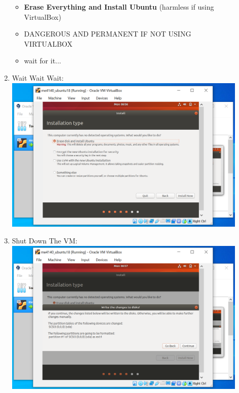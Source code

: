 \documentclass[12pt]{article}
\begin{document}
\begin{description}
\begin{enumerate}
\begin{itemize}
                 \item {\bf Erase Everything and Install Ubuntu} (harmless if using VirtualBox)
                 \item DANGEROUS AND PERMANENT IF NOT USING VIRTUALBOX
                 \item wait for it...    
            \end{itemize}

\item Wait Wait Wait: \vspace{5mm} \\
      		\hspace*{-2.5cm}\includegraphics[scale=.6]{Capture16.png}
	\newpage
\item Shut Down The VM: \vspace{20mm} \\
      		\includegraphics[scale=.6]{Capture17.png}\\
			

\end{enumerate}
\end{description}
\end{document}
